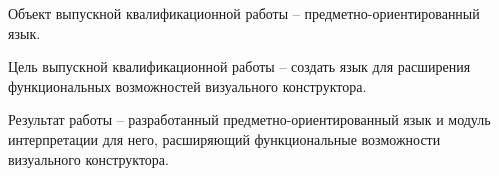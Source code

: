 Объект выпускной квалификационной работы -- предметно-ориентированный язык.

Цель выпускной квалификационной работы -- создать язык для расширения функциональных возможностей визуального конструктора.

Результат работы -- разработанный предметно-ориентированный язык и модуль интерпретации для него, расширяющий функциональные возможности
визуального конструктора.